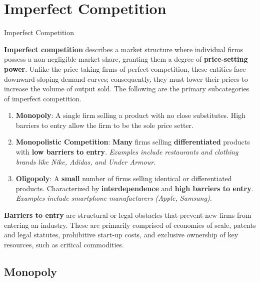 \documentclass[10pt]{article}
\begin{document}
\section{Imperfect Competition}
  \label{sec:icomp}

  \begin{core}{Imperfect Competition}

    \textbf{Imperfect competition} describes a market structure where individual firms possess a non-negligible market share, granting them a degree of \textbf{price-setting power}. Unlike the price-taking firms of perfect competition, these entities face downward-sloping demand curves; consequently, they must lower their prices to increase the volume of output sold. The following are the primary subcategories of imperfect competition.

    \begin{enumerate}

      \item \textbf{Monopoly}: A single firm selling a product with no close substitutes. High barriers to entry allow the firm to be the sole price setter.

      \item \textbf{Monopolistic Competition}: \textbf{Many} firms selling \textbf{differentiated} products with \textbf{low barriers to entry}. \textit{Examples include restaurants and clothing brands like Nike, Adidas, and Under Armour.}

      \item \textbf{Oligopoly}: A \textbf{small} number of firms selling identical or differentiated products. Characterized by \textbf{interdependence} and \textbf{high barriers to entry}. \textit{Examples include smartphone manufacturers (Apple, Samsung).}

    \end{enumerate}

    \textbf{Barriers to entry} are structural or legal obstacles that prevent new firms from entering an industry. These are primarily comprised of economies of scale, patents and legal statutes, prohibitive start-up costs, and exclusive ownership of key resources, such as critical commodities.

  \end{core}

  \subsection{Monopoly}
\end{document}
